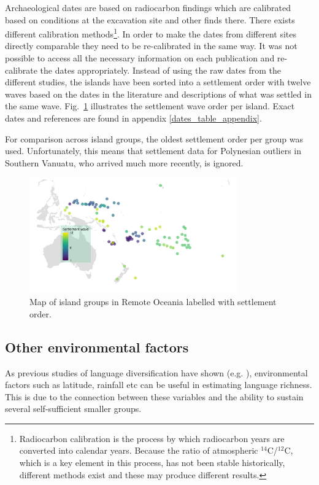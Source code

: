 \documentclass[unnumsec,webpdf,modern,medium]{oup-authoring-template}
\begin{document}
\begin{appendices}
Archaeological dates are based on radiocarbon findings which are calibrated based on conditions at the excavation site and other finds there. There exists different calibration methods\footnote{Radiocarbon calibration is the process by which radiocarbon years are converted into calendar years. Because the ratio of atmospheric $^{14}$C/$^{12}$C, which is a key element in this process, has not been stable historically, different methods exist and these may produce different results.}. In order to make the dates from different sites directly comparable they need to be re-calibrated in the same way. It was not possible to access all the necessary information on each publication and re-calibrate the dates appropriately. Instead of using the raw dates from the different studies, the islands have been sorted into a settlement order with twelve waves based on the dates in the literature and descriptions of what was settled in the same wave. Fig.~\ref{dates_map} illustrates the settlement wave order per island. Exact dates and references are found in appendix \ref{dates_table_appendix}.

For comparison across island groups, the oldest settlement order per group was used. Unfortunately, this means that settlement data for Polynesian outliers in Southern Vanuatu, who arrived much more recently, is ignored.

\begin{figure}
\centering
\includegraphics[width=0.8\textwidth]{Map_RO_dates.png}
\caption{{Map of island groups in Remote Oceania labelled with settlement order.}}
\label{dates_map}
\end{figure}

\FloatBarrier
\subsection{Other environmental factors} 
\label{appendix_environ}
As previous studies of language diversification have shown (e.g. \citet{ greenhill2015demographic, gavin2017process, Pacheco_Coelho_2019, hua2019ecological}), environmental factors such as latitude, rainfall etc can be useful in estimating language richness. This is due to the connection between these variables and the ability to sustain several self-sufficient smaller groups.


\end{appendices}
\end{document}
